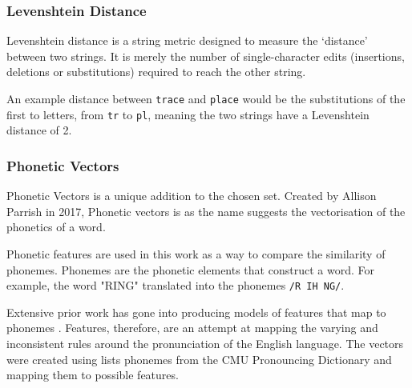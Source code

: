 \subsubsection{Levenshtein Distance}
\label{sec:leven}
Levenshtein distance is a string metric designed to measure the `distance' between two strings. It is merely the number of single-character edits (insertions, deletions or substitutions) required to reach the other string.

An example distance between \verb|trace| and \verb|place| would be the substitutions of the first to letters, from \verb|tr| to \verb|pl|, meaning the two strings have a Levenshtein distance of 2.

\subsubsection{Phonetic Vectors}
\label{sec:phonetic_vectors}
Phonetic Vectors is a unique addition to the chosen set. Created by Allison Parrish in 2017\cite{parrish2017poetic}, Phonetic vectors is as the name suggests the vectorisation of the phonetics of a word.

Phonetic features are used in this work as a way to compare the similarity of phonemes. Phonemes are the phonetic elements that construct a word. For example, the word "RING" translated into the phonemes \verb|/R IH NG/|. 

Extensive prior work has gone into producing models of features that map to phonemes \cite{chomsky1968sound}\cite{ladefoged1969measurement}\cite{bradlow2010perceptual}. Features, therefore, are an attempt at mapping the varying and inconsistent rules around the pronunciation of the English language. The vectors were created using lists phonemes from the CMU Pronouncing Dictionary and mapping them to possible features.

